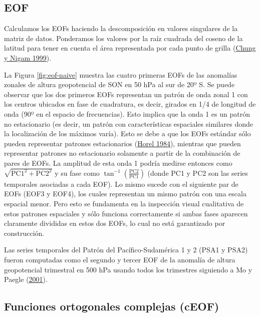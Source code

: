 \documentclass[12pt,oneside,a4paper]{reedthesis}
\begin{document}
\hypertarget{eof}{%
\subsection{EOF}\label{eof}}

Calculamos los EOFs haciendo la descomposición en valores singulares de la matriz de datos.
Ponderamos los valores por la raíz cuadrada del coseno de la latitud para tener en cuenta el área representada por cada punto de grilla (\protect\hyperlink{ref-chung1999}{Chung y Nigam 1999}).

La Figura \ref{fig:eof-naive} muestra las cuatro primeras EOFs de las anomalías zonales de altura geopotencial de SON en 50 hPa al sur de 20º S.
Se puede observar que los dos primeros EOFs representan un patrón de onda zonal 1 con los centros ubicados en fase de cuadratura, es decir, girados en 1/4 de longitud de onda (90º en el espacio de frecuencias).
Esto implica que la onda 1 es un patrón no estacionario (es decir, un patrón con características espaciales similares donde la localización de los máximos varía).
Esto se debe a que los EOFs estándar sólo pueden representar patrones estacionarios (\protect\hyperlink{ref-horel1984}{Horel 1984}), mientras que pueden representar patrones no estacionario solamente a partir de la combinación de pares de EOFs.
La amplitud de esta onda 1 podría medirse entonces como \(\sqrt{\mathrm{PC1}^2 + \mathrm{PC2}^2}\) y su fase como \(\tan^{-1} \left ( \frac{\mathrm{PC2}}{\mathrm{PC1}} \right )\) (donde PC1 y PC2 son las series temporales asociadas a cada EOF).
Lo mismo sucede con el siguiente par de EOFs (EOF3 y EOF4), los cuales representan un mismo patrón con una escala espacial menor.
Pero esto se fundamenta en la inspección visual cualitativa de estos patrones espaciales y sólo funciona correctamente si ambas fases aparecen claramente divididas en estos dos EOFs, lo cual no está garantizado por construcción.

Las series temporales del Patrón del Pacífico-Sudamérica 1 y 2 (PSA1 y PSA2) fueron computadas como el segundo y tercer EOF de la anomalía de altura geopotencial trimestral en 500 hPa usando todos los trimestres siguiendo a Mo y Paegle (\protect\hyperlink{ref-mo2001}{2001}).

\hypertarget{ceof-metodo}{%
\subsection{Funciones ortogonales complejas (cEOF)}\label{ceof-metodo}}
\end{document}
